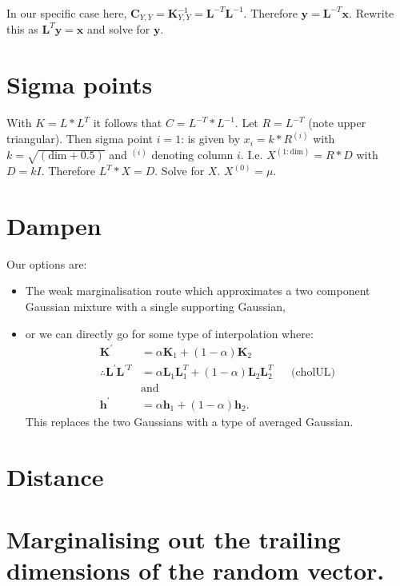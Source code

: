 \documentclass[oneside,english]{scrbook}
\begin{document}
In our specific case here, $\bm{C}_{Y,Y} = \bm{K}_{Y,Y}^{-1} =
\bm{L}^{-T}\bm{L}^{-1}$. Therefore $\bm{y} =
\bm{L}^{-T}\bm{x}$. Rewrite this as $\bm{L}^{T}\bm{y} = \bm{x}$ and
solve for $\bm{y}$.

\section{Sigma points}
With $K = L * L^T$ it follows that $C = L^{-T} * L^{-1}$.
Let $R = L^{-T}$ (note upper triangular).
Then sigma point $i = 1$: is given by $x_i = k * R^{(i)}$
with $k = \sqrt{(\text{dim}+0.5)}$ and $^{(i)}$ denoting column $i$.
I.e. $X^{(1:\text{dim})} = R*D$ with $D = kI$.
Therefore $L^{T} * X = D$.
Solve for $X$. $X^{(0)} = \mu$.

\section{Dampen}
Our options are:
\begin{itemize}
\item The weak marginalisation route which approximates a two component Gaussian mixture with a single supporting Gaussian,
\item or we can directly go for some type of interpolation where:
  \begin{align*}
    \bm{K}^{'} &= \alpha\bm{K}_1 + (1-\alpha)\bm{K}_2 \\
    \therefore
    \bm{L}^{'}\bm{L}^{'T}
    &= \alpha\bm{L}_1\bm{L}_1^{T} + (1-\alpha)\bm{L}_2\bm{L}_2^{T} && \text{(cholUL)}\\
    &\text{and}\\
    \bm{h}^{'} &= \alpha\bm{h}_1 + (1-\alpha)\bm{h}_2.
  \end{align*}
  This replaces the two Gaussians with a type of averaged Gaussian.
\end{itemize}

\section{Distance}
\section{Marginalising out the trailing dimensions of the random vector.}
\end{document}
